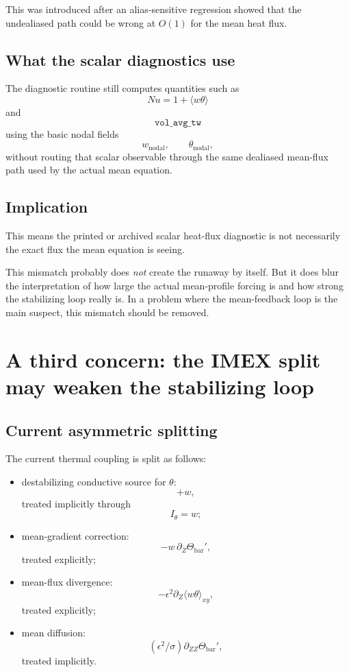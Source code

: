 \documentclass[11pt]{article}
\begin{document}
This was introduced after an alias-sensitive regression showed that the undealiased path could be wrong at $O(1)$ for the mean heat flux.

\subsection{What the scalar diagnostics use}

The diagnostic routine still computes quantities such as
\[
Nu = 1 + \langle w\theta\rangle
\]
and
\[
\texttt{vol\_avg\_tw}
\]
using the basic nodal fields
\[
w_{\mathrm{nodal}},\qquad \theta_{\mathrm{nodal}},
\]
without routing that scalar observable through the same dealiased mean-flux path used by the actual mean equation.

\subsection{Implication}

This means the printed or archived scalar heat-flux diagnostic is not necessarily the exact flux the mean equation is seeing.

This mismatch probably does \emph{not} create the runaway by itself. But it does blur the interpretation of how large the actual mean-profile forcing is and how strong the stabilizing loop really is. In a problem where the mean-feedback loop is the main suspect, this mismatch should be removed.

\section{A third concern: the IMEX split may weaken the stabilizing loop}

\subsection{Current asymmetric splitting}

The current thermal coupling is split as follows:

\begin{itemize}
\item destabilizing conductive source for $\theta$:
\[
+w,
\]
treated implicitly through
\[
I_\theta = w;
\]
\item mean-gradient correction:
\[
-w\,\partial_Z\Theta_{\mathrm{bar}}',
\]
treated explicitly;
\item mean-flux divergence:
\[
-\epsilon^2 \partial_Z \langle w\theta\rangle_{xy},
\]
treated explicitly;
\item mean diffusion:
\[
(\epsilon^2/\sigma)\partial_{ZZ}\Theta_{\mathrm{bar}}',
\]
treated implicitly.
\end{itemize}
\end{document}
